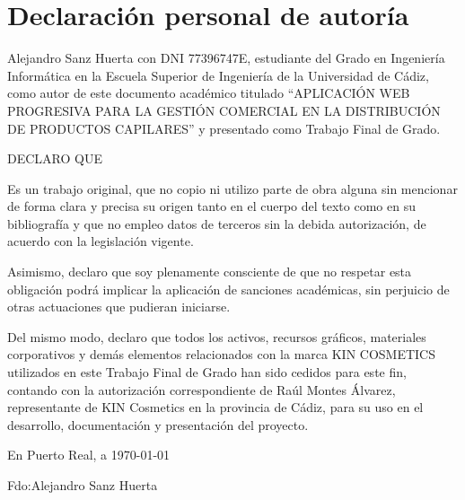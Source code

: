 \newpage{\ }
\thispagestyle{empty}

\clearpage\setcounter{page}{-1} %

\chapter*{Declaración personal de autoría}

\vspace{15mm}

\noindent Alejandro Sanz Huerta con DNI 77396747E, estudiante del Grado en Ingeniería Informática en la Escuela Superior de Ingeniería de la Universidad de Cádiz, como autor de este documento académico titulado ``APLICACIÓN WEB PROGRESIVA PARA LA GESTIÓN COMERCIAL EN LA DISTRIBUCIÓN DE PRODUCTOS CAPILARES'' y presentado como Trabajo Final de Grado.
\vspace{15mm}


DECLARO QUE \\
\vspace{1mm}

\noindent Es un trabajo original, que no copio ni utilizo parte de obra alguna sin mencionar de forma clara y precisa su origen tanto en el cuerpo del texto como en su bibliografía y que no empleo datos de terceros sin la debida autorización, de acuerdo con la legislación vigente.

Asimismo, declaro que soy plenamente consciente de que no respetar esta obligación podrá implicar la aplicación de sanciones académicas, sin perjuicio de otras actuaciones que pudieran iniciarse.

Del mismo modo, declaro que todos los activos, recursos gráficos, materiales corporativos y demás elementos relacionados con la marca KIN COSMETICS utilizados en este Trabajo Final de Grado han sido cedidos para este fin, contando con la autorización correspondiente de Raúl Montes Álvarez, representante de KIN Cosmetics en la provincia de Cádiz, para su uso en el desarrollo, documentación y presentación del proyecto.

En Puerto Real, a \today

\vspace{15mm}
\noindent Fdo:\hspace{1em}Alejandro Sanz Huerta
